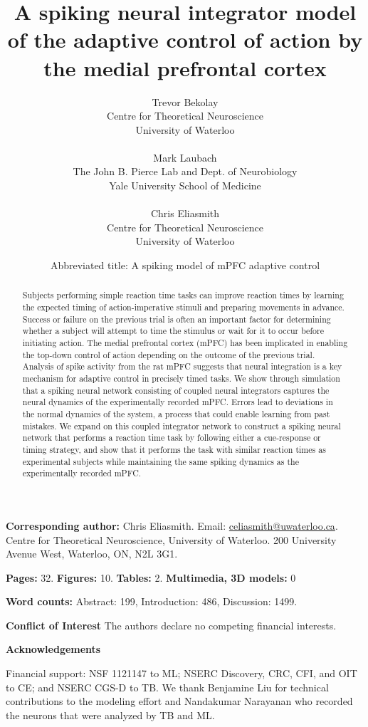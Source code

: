 \documentclass[11pt]{article}
\title{A spiking neural integrator model of the adaptive control of
  action by the medial prefrontal cortex}
\date{Abbreviated title: A spiking model of mPFC adaptive control}
\author{%
  Trevor Bekolay \\
  Centre for Theoretical Neuroscience \\
  University of Waterloo \\ ~ \\
  Mark Laubach \\
  The John B. Pierce Lab and Dept. of Neurobiology \\
  Yale University School of Medicine \\ ~ \\
  Chris Eliasmith \\
  Centre for Theoretical Neuroscience \\
  University of Waterloo}
\begin{document}
\maketitle

\textbf{Corresponding author:} Chris Eliasmith.
Email: \url{celiasmith@uwaterloo.ca}.
Centre for Theoretical Neuroscience, University of Waterloo.
200 University Avenue West, Waterloo, ON, N2L 3G1.

\textbf{Pages:} 32. \textbf{Figures:} 10. \textbf{Tables:} 2. \textbf{Multimedia, 3D models:} 0

\textbf{Word counts:} Abstract: 199, Introduction: 486, Discussion: 1499.

\textbf{Conflict of Interest}
The authors declare no competing financial interests.

\textbf{Acknowledgements}

Financial support: NSF 1121147 to ML;
NSERC Discovery, CRC, CFI, and OIT to CE;
and NSERC CGS-D to TB.
We thank Benjamine Liu for technical contributions
to the modeling effort and
Nandakumar Narayanan who recorded the neurons
that were analyzed by TB and ML.

\clearpage

\begin{abstract}
  Subjects performing simple reaction time tasks
  can improve reaction times by learning the expected timing
  of action-imperative stimuli
  and preparing movements in advance.
  Success or failure on the previous trial
  is often an important factor for determining
  whether a subject will attempt to time
  the stimulus or wait for it to occur
  before initiating action.
  The medial prefrontal cortex (mPFC) has been implicated
  in enabling the top-down control of action
  depending on the outcome of the previous trial.
  Analysis of spike activity from the rat mPFC
  suggests that neural integration is a key mechanism
  for adaptive control in precisely timed tasks.
  We show through simulation
  that a spiking neural network
  consisting of coupled neural integrators
  captures the neural dynamics
  of the experimentally recorded mPFC.
  Errors lead to deviations in the normal
  dynamics of the system,
  a process that could enable learning
  from past mistakes.
  We expand on this coupled integrator network
  to construct a spiking neural network that
  performs a reaction time task by following
  either a cue-response or timing strategy,
  and show that it performs the task
  with similar reaction times as experimental subjects
  while maintaining the same spiking dynamics
  as the experimentally recorded mPFC.
\end{abstract}
\end{document}
